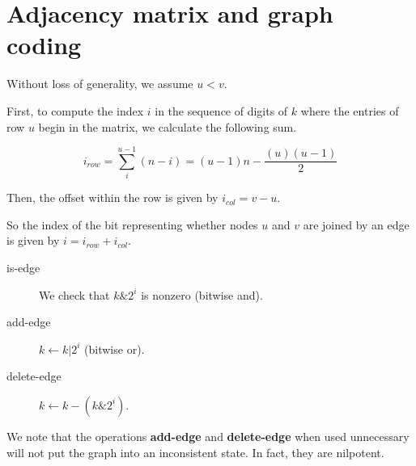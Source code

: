 \documentclass{article}
\begin{document}
\section{Adjacency matrix and graph coding}

Without loss of generality, we assume $u < v$.

First, to compute the index $i$ in the sequence of digits of $k$ where the entries of row $u$ begin in the matrix, we calculate the following sum.

$$ i_{row} = \sum_i^{u-1} {(n - i)} = (u-1)n - \frac{(u)(u-1)}{2} $$

Then, the offset within the row is given by $i_{col} = v - u$.

So the index of the bit representing whether nodes $u$ and $v$ are joined by an edge is given by $i = i_{row} + i_{col}$.

\begin{description}
    \item[is-edge] We check that $k \& 2^i$ is nonzero (bitwise and).
    \item[add-edge] $k \gets k | 2^i$ (bitwise or).
    \item[delete-edge] $k \gets k - (k \& 2^i)$.
\end{description}

We note that the operations \textbf{add-edge} and \textbf{delete-edge} when used unnecessary will not put the graph into an inconsistent state. In fact, they are nilpotent.
\end{document}
